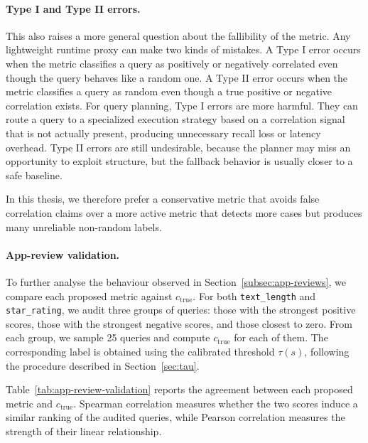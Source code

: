 \paragraph{Type I and Type II errors.}

This also raises a more general question about the fallibility of the metric.
Any lightweight runtime proxy can make two kinds of mistakes.
A Type I error occurs when the metric classifies a query as positively or negatively correlated even though the query behaves like a random one.
A Type II error occurs when the metric classifies a query as random even though a true positive or negative correlation exists.
For query planning, Type I errors are more harmful.
They can route a query to a specialized execution strategy based on a correlation signal that is not actually present, producing unnecessary recall loss or latency overhead.
Type II errors are still undesirable, because the planner may miss an opportunity to exploit structure, but the fallback behavior is usually closer to a safe baseline.

In this thesis, we therefore prefer a conservative metric that avoids false correlation claims over a more active metric that detects more cases but produces many unreliable non-random labels.

\paragraph{App-review validation.}

To further analyse the behaviour observed in Section~\ref{subsec:app-reviews}, we compare each proposed metric against \(c_{\mathrm{true}}\).
For both \texttt{text\_length} and \texttt{star\_rating}, we audit three groups of queries: those with the strongest positive scores, those with the strongest negative scores, and those closest to zero.
From each group, we sample 25 queries and compute \(c_{\mathrm{true}}\) for each of them.
The corresponding label is obtained using the calibrated threshold \(\tau(s)\), following the procedure described in Section~\ref{sec:tau}.

Table~\ref{tab:app-review-validation} reports the agreement between each proposed metric and \(c_{\mathrm{true}}\).
Spearman correlation measures whether the two scores induce a similar ranking of the audited queries, while Pearson correlation measures the strength of their linear relationship.


